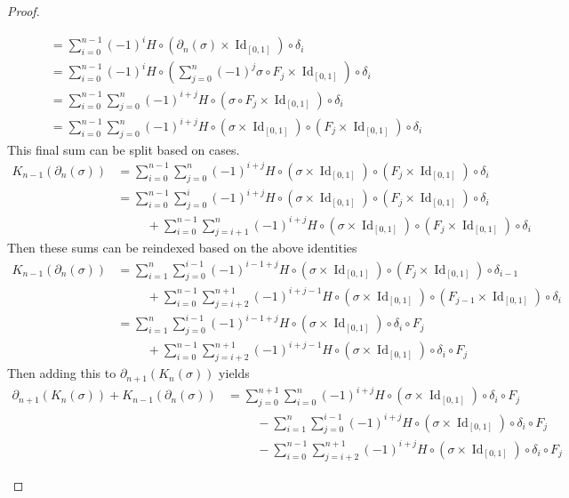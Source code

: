\documentclass{article}
\newcommand{\id}[1]{\operatorname{Id}_{#1}}
\begin{document}
\begin{proof}
\begin{enumerate}[a.]
\begin{align*}
      &= \sum_{i=0}^{n-1} (-1)^{i} H\circ(\partial_n(\sigma) \times \id{[0,1]}) \circ \delta_i \\
      &= \sum_{i=0}^{n-1} (-1)^{i} H\circ\left(\sum_{j=0}^n(-1)^j\sigma \circ F_j \times \id{[0,1]}\right) \circ \delta_i \\
      &= \sum_{i=0}^{n-1}\sum_{j=0}^n (-1)^{i+j} H\circ\left(\sigma \circ F_j \times \id{[0,1]}\right) \circ \delta_i \\
      &= \sum_{i=0}^{n-1}\sum_{j=0}^n (-1)^{i+j} H\circ(\sigma \times \id{[0,1]}) \circ (F_j \times \id{[0,1]}) \circ \delta_i
    \end{align*}
    This final sum can be split based on cases.
    \begin{align*}
      K_{n-1}(\partial_{n}(\sigma))
      &=\sum_{i=0}^{n-1}\sum_{j=0}^n (-1)^{i+j} H\circ(\sigma \times \id{[0,1]}) \circ (F_j \times \id{[0,1]}) \circ \delta_i \\
      &= \sum_{i=0}^{n-1}\sum_{j=0}^i (-1)^{i+j} H\circ(\sigma \times \id{[0,1]}) \circ (F_j \times \id{[0,1]}) \circ \delta_i \\
      &\hspace{1cm}+ \sum_{i=0}^{n-1}\sum_{j=i+1}^n (-1)^{i+j} H\circ(\sigma \times \id{[0,1]}) \circ (F_j \times \id{[0,1]}) \circ \delta_i
    \end{align*}
    Then these sums can be reindexed based on the above identities \begin{align*}
      K_{n-1}(\partial_{n}(\sigma))
      &= \sum_{i=1}^{n}\sum_{j=0}^{i-1} (-1)^{i-1+j} H\circ(\sigma \times \id{[0,1]}) \circ (F_j \times \id{[0,1]}) \circ \delta_{i-1}\\
      &\hspace{1cm}+ \sum_{i=0}^{n-1}\sum_{j=i+2}^{n+1} (-1)^{i+j-1} H\circ(\sigma \times \id{[0,1]}) \circ (F_{j-1} \times \id{[0,1]}) \circ \delta_i\\
      &= \sum_{i=1}^{n}\sum_{j=0}^{i-1} (-1)^{i-1+j} H\circ(\sigma \times \id{[0,1]}) \circ \delta_i \circ F_j\\
      &\hspace{1cm}+ \sum_{i=0}^{n-1}\sum_{j=i+2}^{n+1} (-1)^{i+j-1} H\circ(\sigma \times \id{[0,1]}) \circ \delta_i \circ F_j
    \end{align*}
    Then adding this to $\partial_{n+1}(K_n(\sigma))$ yields \begin{align*}
      \partial_{n+1}(K_n(\sigma)) + K_{n-1}(\partial_{n}(\sigma))
      &= \sum_{j=0}^{n+1}\sum_{i=0}^{n} (-1)^{i + j} H\circ(\sigma \times \id{[0,1]}) \circ \delta_i \circ F_j \\
      &\hspace{1cm}- \sum_{i=1}^{n}\sum_{j=0}^{i-1} (-1)^{i+j} H\circ(\sigma \times \id{[0,1]}) \circ \delta_i \circ F_j \\
      &\hspace{1cm}- \sum_{i=0}^{n-1}\sum_{j=i+2}^{n+1} (-1)^{i+j} H\circ(\sigma \times \id{[0,1]}) \circ \delta_i \circ F_j
    \end{align*}
  \end{enumerate}

\end{proof}
\end{document}
